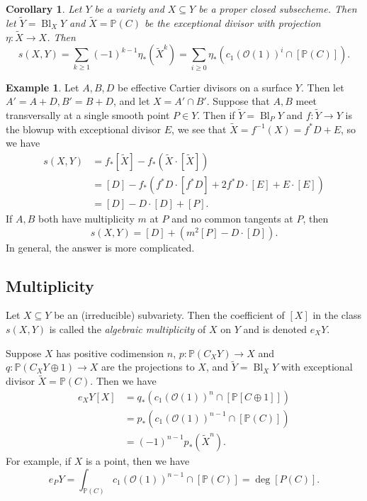 \documentclass[leqno, openany]{memoir}
\newtheorem{cor}[thm]{Corollary}
\theoremstyle{definition}
\newtheorem{exm}[thm]{Example}
\theoremstyle{remark}
\theoremstyle{plain}
\theoremstyle{definition}
\theoremstyle{remark}
\renewcommand{\P}{\mathbb{P}}
\newcommand{\mc}[1]{\mathcal{#1}}
\newcommand{\wt}[1]{\widetilde{#1}}
\DeclareMathOperator{\Bl}{Bl}
\begin{document}
\begin{cor}
    Let $Y$ be a variety and $X \subseteq Y$ be a proper closed subsecheme. Then let $\wt{Y} = \operatorname{Bl}_X Y$ and $\wt{X} = \P(C)$ be the exceptional divisor with projection $\eta \colon \wt{X} \to X$. Then
    \[ s(X,Y) = \sum_{k \geq 1} {(-1)}^{k-1} \eta_* (\wt{X}^k) = \sum_{i \geq 0} \eta_* ({c_1(\mc{O}(1))}^i \cap [\P(C)]). \]
\end{cor}

\begin{exm}
    Let $A, B, D$ be effective Cartier divisors on a surface $Y$. Then let $A' = A + D, B' = B + D$, and let $X = A' \cap B'$. Suppose that $A, B$ meet transversally at a single smooth point $P \in Y$. Then if $\wt{Y} = \Bl_P Y$ and $f \colon \wt{Y} \to Y$ is the blowup with exceptional divisor $E$, we see that $\wt{X} = f^{-1}(X) = f^* D + E$, so we have
    \begin{align*}
        s(X,Y) &= f_* [\wt{X}] - f_* (\wt{X} \cdot [\wt{X}]) \\
               &= [D] - f_* (f^* D \cdot [f^* D] + 2 f^* D \cdot [E] + E \cdot [E]) \\
               &= [D] - D \cdot [D] + [P]. 
    \end{align*}
    If $A,B$ both have multiplicity $m$ at $P$ and no common tangents at $P$, then
    \[ s(X,Y) = [D] + (m^2[P] - D \cdot [D]). \]
    In general, the answer is more complicated.
\end{exm}

\subsection{Multiplicity}%
\label{sub:multiplicity}

Let $X \subseteq Y$ be an (irreducible) subvariety. Then the coefficient of $[X]$ in the class $s(X,Y)$ is called the \textit{algebraic multiplicity} of $X$ on $Y$ and is denoted $e_X Y$. 

Suppose $X$ has positive codimension $n$, $p \colon \P(C_X Y) \to X$ and $q \colon \P(C_X Y \oplus 1) \to X$ are the projections to $X$, and $\wt{Y} = \operatorname{Bl}_X Y$ with exceptional divisor $\wt{X} = \P(C)$. Then we have
\begin{align*}
    e_X Y [X] &= q_* ( {c_1 ( \mc{O}(1) )}^n \cap [\P[C \oplus 1]] ) \\
              &= p_* ({c_1 (\mc{O}(1))}^{n-1} \cap [\P(C)]) \\
              &= {(-1)}^{n-1} p_* (\wt{X}^n). 
\end{align*}
For example, if $X$ is a point, then we have
\[ e_P Y = \int_{\P(C)} {c_1(\mc{O}(1))}^{n-1} \cap [\P(C)] = \deg [P(C)]. \]
\end{document}
